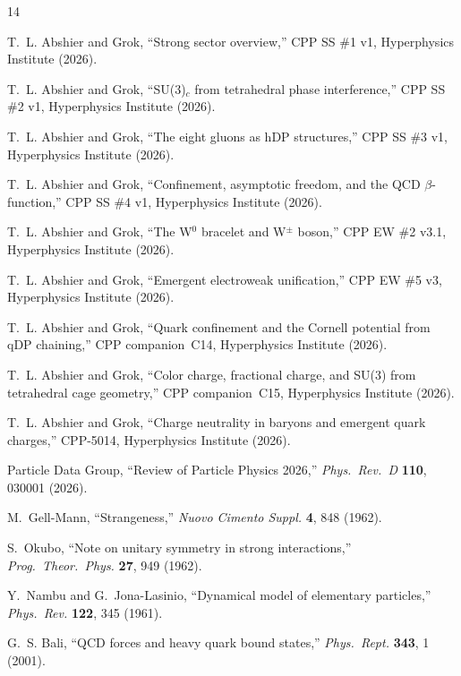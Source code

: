\documentclass[11pt,a4paper]{article}
\begin{document}
\begin{thebibliography}{14}

T.~L. Abshier and Grok,
``Strong sector overview,''
CPP SS \#1 v1, Hyperphysics Institute (2026).

T.~L. Abshier and Grok,
``SU(3)$_c$ from tetrahedral phase interference,''
CPP SS \#2 v1, Hyperphysics Institute (2026).

T.~L. Abshier and Grok,
``The eight gluons as hDP structures,''
CPP SS \#3 v1, Hyperphysics Institute (2026).

T.~L. Abshier and Grok,
``Confinement, asymptotic freedom, and the QCD $\beta$-function,''
CPP SS \#4 v1, Hyperphysics Institute (2026).

T.~L. Abshier and Grok,
``The W$^0$ bracelet and W$^\pm$ boson,''
CPP EW \#2 v3.1, Hyperphysics Institute (2026).

T.~L. Abshier and Grok,
``Emergent electroweak unification,''
CPP EW \#5 v3, Hyperphysics Institute (2026).

T.~L. Abshier and Grok,
``Quark confinement and the Cornell potential from qDP chaining,''
CPP companion~C14, Hyperphysics Institute (2026).

T.~L. Abshier and Grok,
``Color charge, fractional charge, and SU(3) from tetrahedral cage geometry,''
CPP companion~C15, Hyperphysics Institute (2026).

T.~L. Abshier and Grok,
``Charge neutrality in baryons and emergent quark charges,''
CPP-5014, Hyperphysics Institute (2026).

Particle Data Group,
``Review of Particle Physics 2026,''
\textit{Phys.\ Rev.\ D} \textbf{110}, 030001 (2026).

M.~Gell-Mann,
``Strangeness,''
\textit{Nuovo Cimento Suppl.} \textbf{4}, 848 (1962).

S.~Okubo,
``Note on unitary symmetry in strong interactions,''
\textit{Prog.\ Theor.\ Phys.} \textbf{27}, 949 (1962).

Y.~Nambu and G.~Jona-Lasinio,
``Dynamical model of elementary particles,''
\textit{Phys.\ Rev.} \textbf{122}, 345 (1961).

G.~S. Bali,
``QCD forces and heavy quark bound states,''
\textit{Phys.\ Rept.} \textbf{343}, 1 (2001).

\end{thebibliography}
\end{document}
